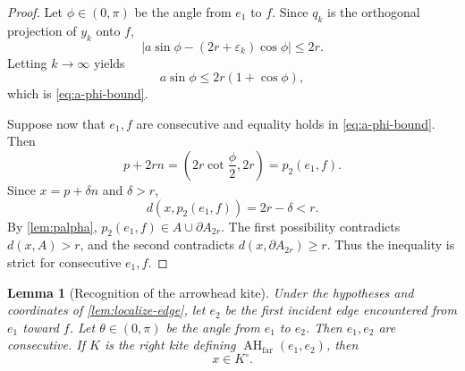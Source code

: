 \documentclass[11pt]{article}
\newtheorem{lemma}[theorem]{Lemma}
\newcommand{\AHfar}{\operatorname{AH}_{\mathrm{far}}}
\newcommand{\eps}{\varepsilon}
\numberwithin{equation}{section}
\begin{document}
\begin{proof}
Let $\phi\in(0,\pi)$ be the angle from $e_1$ to $f$. Since $q_k$ is the orthogonal projection of $y_k$ onto $f$,
\[
\left|a\sin\phi-(2r+\eps_k)\cos\phi\right|\le2r.
\]
Letting $k\to\infty$ yields
\[
a\sin\phi\le2r(1+\cos\phi),
\]
which is \eqref{eq:a-phi-bound}.

Suppose now that $e_1,f$ are consecutive and equality holds in \eqref{eq:a-phi-bound}. Then
\[
p+2rn
=\left(2r\cot\frac\phi2,2r\right)
=p_2(e_1,f).
\]
Since $x=p+\delta n$ and $\delta>r$,
\[
d(x,p_2(e_1,f))=2r-\delta<r.
\]
By \cref{lem:palpha}, $p_2(e_1,f)\in A\cup\partial A_{2r}$. The first possibility contradicts $d(x,A)>r$, and the second contradicts $d(x,\partial A_{2r})\ge r$. Thus the inequality is strict for consecutive $e_1,f$.
\end{proof}

\begin{lemma}[Recognition of the arrowhead kite]\label{lem:recognize-kite}
Under the hypotheses and coordinates of \cref{lem:localize-edge}, let $e_2$ be the first incident edge encountered from $e_1$ toward $f$. Let $\theta\in(0,\pi)$ be the angle from $e_1$ to $e_2$. Then $e_1,e_2$ are consecutive. If $K$ is the right kite defining $\AHfar(e_1,e_2)$, then
\[
\boxed{x\in K^\circ.}
\]
\end{lemma}
\end{document}
